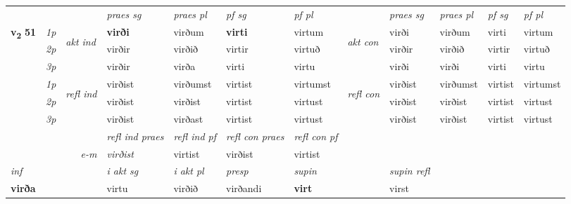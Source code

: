 \begin{longtable}[l]{X>{\footnotesize\itshape}llXXXXlXXXX}
 & &   & \textit{praes sg}  & \textit{praes pl}    & \textit{ pf sg} & \textit{pf pl} & & \textit{praes sg}  & \textit{praes pl}    & \textit{pf sg} & \textit{pf pl }  \\ \cmidrule{4-7} \cmidrule{9-12}
 \multirow{2}{*}{{{\textbf{v{\textsubscript{2}}} \Large{\textbf{51}}}}}  & 1p & \multirow{3}{*}{\begin{turn}{90}\textit{akt ind}\end{turn}} & \textbf{virði} & virðum & \textbf{virti} & virtum & \multirow{3}{*}{\begin{turn}{90}\textit{akt con}\end{turn}} &virði & virðum & virti & virtum\\*
 & 2p &  &  virðir  & virðið & virtir & virtuð & & virðir & virðið & virtir & virtuð \\*
 & 3p &  & virðir & virða & virti & virtu & & virði & virði& virti & virtu \\*
\cmidrule{4-7} \cmidrule{9-12}
 & 1p & \multirow{3}{*}{\begin{turn}{90}\textit{refl ind}\end{turn}}  & virðist & virðumst & virtist & virtumst & \multirow{3}{*}{\begin{turn}{90}\textit{refl con}\end{turn}}  &virðist & virðumst & virtist & virtumst \\*
 & 2p &  & virðist & virðist & virtist & virtust & &virðist & virðist & virtist & virtust \\*
 & 3p  & & virðist & virðast & virtist & virtust & & virðist & virðist& virtist & virtust \\*
\cmidrule{4-7} \cmidrule{9-12}

 & && \textit{refl ind praes} & \textit{refl ind pf} & \textit{refl con praes} & \textit{refl con pf} \\*
\multicolumn{3}{r}{\textit{e-m}}& virðist & virtist & virðist & virtist \\*

\cmidrule{4-7}
   {\textit{inf}} & &  & \textit{i akt sg} & \textit{i akt pl}   & \textit{presp} & \textit{supin} && \textit{supin refl}  \\*
  {\textbf{virða}} & && virtu  & virðið   & virðandi &  \textbf{virt} && virst  \\*

\midrule


\end{longtable}
